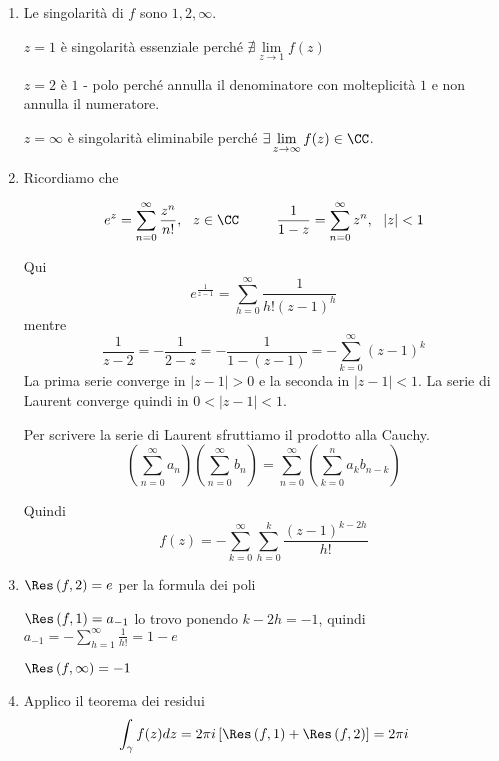 \begin{enumerate}
\item Le singolarità di $f$ sono $1, 2, \infty $.

$z = 1$ è singolarità essenziale perché $\nexists \lim\limits_{z\rightarrow 1} f(z)$

$z = 2$ è $1$ - polo perché annulla il denominatore con molteplicità $1$ e non annulla il numeratore.

$z = \infty $ è singolarità eliminabile perché $\exists \lim\limits_{z\rightarrow \infty} f(z) \in \CC $.
\item Ricordiamo che

\begin{rem}
\begin{equation*}
e^{z} = \sum\limits^{\infty}_{n = 0}\frac{z^{n}}{n!}, \ \ z\in \CC \ \ \ \ \ \ \ \ \frac{1}{1 - z} = \sum\limits^{\infty}_{n = 0} z^{n}, \ \ \left| z\right| < 1
\end{equation*}
\end{rem}

Qui
\begin{equation*}
e^{\frac{1}{z - 1}} = \sum\limits^{\infty}_{h = 0}\frac{1}{h!\left(z - 1\right)^{h}}
\end{equation*}mentre
\begin{equation*}
\frac{1}{z - 2} = - \frac{1}{2 - z} = - \frac{1}{1 - \left(z - 1\right)} = - \sum\limits^{\infty}_{k = 0}\left(z - 1\right)^{k}
\end{equation*}La prima serie converge in $\left| z - 1\right| > 0$ e la seconda in $\left| z - 1\right| < 1$. La serie di Laurent converge quindi in $0 < \left| z - 1\right| < 1$.
\begin{rem}
Per scrivere la serie di Laurent sfruttiamo il prodotto alla Cauchy.
\begin{equation*}
\left(\sum\limits^{\infty}_{n = 0} a_{n}\right)\left(\sum\limits^{\infty}_{n = 0} b_{n}\right) = \sum\limits^{\infty}_{n = 0}\left(\sum\limits^{n}_{k = 0} a_{k} b_{n - k}\right)
\end{equation*}
\end{rem}Quindi
\begin{equation*}
f(z) = - \sum\limits^{\infty}_{k = 0}\sum\limits^{k}_{h = 0}\frac{\left(z - 1\right)^{k - 2h}}{h!}
\end{equation*}
\item $\Res \left(f, 2\right) = e$ per la formula dei poli

$\Res \left(f, 1\right) = a_{- 1}$ lo trovo ponendo $k - 2h = -1$, quindi $a_{- 1} = - \sum\limits^{\infty}_{h = 1}\frac{1}{h!} = 1 - e$

$\Res \left(f, \infty \right) = - 1$
\item Applico il teorema dei residui
\begin{equation*}
\int\nolimits_{\gamma} f(z) dz = 2\pi i\left[\Res \left(f, 1\right) + \Res \left(f, 2\right)\right] = 2\pi i
\end{equation*}
\end{enumerate}
